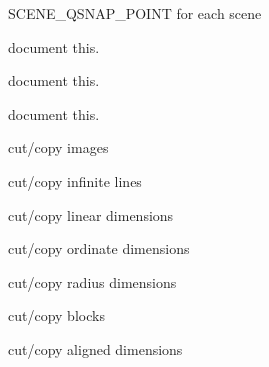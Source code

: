 \begin{DoxyRefList}
\label{todo__todo000195}%
%
SCENE\+\_\+\+QSNAP\+\_\+\+POINT for each scene 
\item[Member \mbox{\hyperlink{imgui__main_8c_af3a1ec0a097fd17ed8066a9998940704}{create\+Grid\+Iso}} (void)]\label{todo__todo000046}%
%
document this.  
\item[Member \mbox{\hyperlink{imgui__main_8c_a990d2f3521e68827189eb1ea7ea49153}{create\+Grid\+Polar}} (void)]\label{todo__todo000045}%
%
document this.  
\item[Member \mbox{\hyperlink{imgui__main_8c_a1ef382b5c1b396c2d228932d2ea3c2ef}{create\+Grid\+Rect}} (void)]\label{todo__todo000044}%
%
document this.  
\item[Member \mbox{\hyperlink{imgui__main_8c_adce5db5dd1e8ab7e28b2908953bed991}{create\+Object\+List}} (Emb\+Array $\ast$list)]\label{todo__todo000060}%
%
cut/copy images

\label{todo__todo000061}%
%
cut/copy infinite lines

\label{todo__todo000062}%
%
cut/copy linear dimensions

\label{todo__todo000063}%
%
cut/copy ordinate dimensions

\label{todo__todo000064}%
%
cut/copy radius dimensions 

\label{todo__todo000057}%
%
cut/copy blocks

\label{todo__todo000058}%
%
cut/copy aligned dimensions


\end{DoxyRefList}
